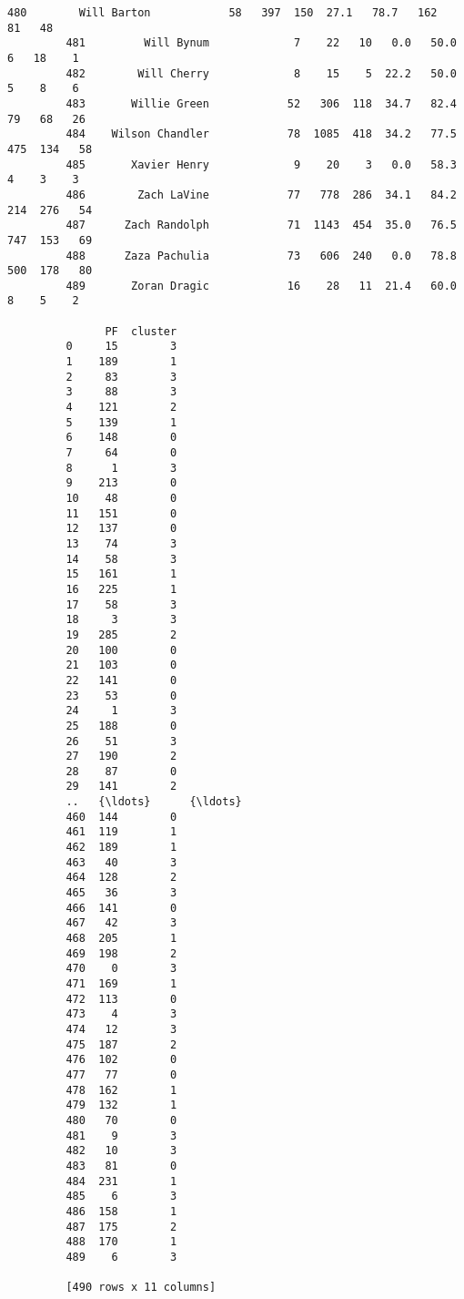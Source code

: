 \documentclass[11pt]{article}
\begin{document}
\begin{Verbatim}[commandchars=\\\{\}]
         480        Will Barton            58   397  150  27.1   78.7   162   81   48   
         481         Will Bynum             7    22   10   0.0   50.0     6   18    1   
         482        Will Cherry             8    15    5  22.2   50.0     5    8    6   
         483       Willie Green            52   306  118  34.7   82.4    79   68   26   
         484    Wilson Chandler            78  1085  418  34.2   77.5   475  134   58   
         485       Xavier Henry             9    20    3   0.0   58.3     4    3    3   
         486        Zach LaVine            77   778  286  34.1   84.2   214  276   54   
         487      Zach Randolph            71  1143  454  35.0   76.5   747  153   69   
         488      Zaza Pachulia            73   606  240   0.0   78.8   500  178   80   
         489       Zoran Dragic            16    28   11  21.4   60.0     8    5    2   
         
               PF  cluster  
         0     15        3  
         1    189        1  
         2     83        3  
         3     88        3  
         4    121        2  
         5    139        1  
         6    148        0  
         7     64        0  
         8      1        3  
         9    213        0  
         10    48        0  
         11   151        0  
         12   137        0  
         13    74        3  
         14    58        3  
         15   161        1  
         16   225        1  
         17    58        3  
         18     3        3  
         19   285        2  
         20   100        0  
         21   103        0  
         22   141        0  
         23    53        0  
         24     1        3  
         25   188        0  
         26    51        3  
         27   190        2  
         28    87        0  
         29   141        2  
         ..   {\ldots}      {\ldots}  
         460  144        0  
         461  119        1  
         462  189        1  
         463   40        3  
         464  128        2  
         465   36        3  
         466  141        0  
         467   42        3  
         468  205        1  
         469  198        2  
         470    0        3  
         471  169        1  
         472  113        0  
         473    4        3  
         474   12        3  
         475  187        2  
         476  102        0  
         477   77        0  
         478  162        1  
         479  132        1  
         480   70        0  
         481    9        3  
         482   10        3  
         483   81        0  
         484  231        1  
         485    6        3  
         486  158        1  
         487  175        2  
         488  170        1  
         489    6        3  
         
         [490 rows x 11 columns]
\end{Verbatim}
            
\end{document}
